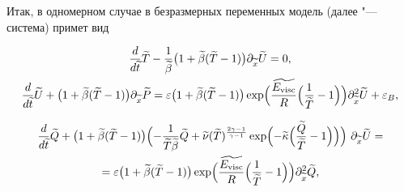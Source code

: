 Итак, в одномерном случае в безразмерных переменных модель (далее "--- система) примет вид

\begin{gather}

\frac{d}{d\widetilde{t}} \widetilde{T}-\frac1{\widetilde{\beta}} 

\bigl(1+\widetilde{\beta}(\widetilde{T}-1)\bigr) {\partial}_{\widetilde{x}} \widetilde{U}=0,

\\


\frac{d}{d\widetilde{t}} \widetilde{U}+

\bigl(1+\widetilde{\beta}(\widetilde{T}-1)\bigr){\partial}_{\widetilde{x}} \widetilde{P}=

{\varepsilon} \bigl(1+\widetilde{\beta}(\widetilde{T}-1)\bigr) 

\exp\Bigl(\frac{\widetilde{E_{\rm visc}}}{R}\Bigl(\frac1{\widetilde{T}}-1\Bigr)\Bigr) \partial^2_{\widetilde{x}} \widetilde{U} +{\varepsilon}_B,

\end{gather}

\begin{multline}

\frac{d}{d\widetilde{t}} \widetilde{Q}+

\bigl(1+\widetilde{\beta}(\widetilde{T}-1)\bigr)

\Bigl(-\frac{1}{\widetilde{T} \widetilde{\beta}} \widetilde{Q}+\widetilde{\nu}

(\widetilde{T})^{\frac{2\gamma-1}{\gamma-1}}

 \exp\Bigl(-\widetilde{\kappa}\Bigl(\frac{\widetilde{Q}}{\widetilde{T}}-1\Bigr) \Bigr)

 \Bigr)~{\partial}_{\widetilde{x}} \widetilde{U}=

\\

 ={\varepsilon} \bigl(1+\widetilde{\beta}(\widetilde{T}-1)\bigr) 

 \exp\Bigl(\frac{\widetilde{E_{\rm visc}}}{R}\Bigl(\frac1{\widetilde{T}}-1\Bigr)\Bigr) \partial^2_{\widetilde{x}} \widetilde{Q},

 \end{multline}

